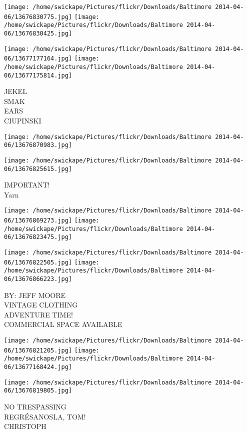 \documentclass[10pt,letterpaper]{article}
\begin{document}
\texttt{[image: /home/swickape/Pictures/flickr/Downloads/Baltimore 2014-04-06/13676830775.jpg]}
\texttt{[image: /home/swickape/Pictures/flickr/Downloads/Baltimore 2014-04-06/13676830425.jpg]}

\texttt{[image: /home/swickape/Pictures/flickr/Downloads/Baltimore 2014-04-06/13677177164.jpg]}
\texttt{[image: /home/swickape/Pictures/flickr/Downloads/Baltimore 2014-04-06/13677175814.jpg]}

JEKEL\\
SMAK\\
EARS\\
CIUPINSKI\\
\pagebreak

\texttt{[image: /home/swickape/Pictures/flickr/Downloads/Baltimore 2014-04-06/13676870983.jpg]}

\vspace{0.25in}
\texttt{[image: /home/swickape/Pictures/flickr/Downloads/Baltimore 2014-04-06/13676825615.jpg]}

IMPORTANT!\\
Yarn\\
\pagebreak

\texttt{[image: /home/swickape/Pictures/flickr/Downloads/Baltimore 2014-04-06/13676869273.jpg]}
\texttt{[image: /home/swickape/Pictures/flickr/Downloads/Baltimore 2014-04-06/13676823475.jpg]}

\texttt{[image: /home/swickape/Pictures/flickr/Downloads/Baltimore 2014-04-06/13676822505.jpg]}
\texttt{[image: /home/swickape/Pictures/flickr/Downloads/Baltimore 2014-04-06/13676866223.jpg]}

BY: JEFF MOORE\\
VINTAGE CLOTHING\\
ADVENTURE TIME!\\
COMMERCIAL SPACE AVAILABLE\\
\pagebreak

\texttt{[image: /home/swickape/Pictures/flickr/Downloads/Baltimore 2014-04-06/13676821205.jpg]}
\texttt{[image: /home/swickape/Pictures/flickr/Downloads/Baltimore 2014-04-06/13677168424.jpg]}

\texttt{[image: /home/swickape/Pictures/flickr/Downloads/Baltimore 2014-04-06/13676819805.jpg]}

NO TRESPASSING\\
REGRÉSANOSLA, TOM!\\
CHRISTOPH\\
\pagebreak
\end{document}

